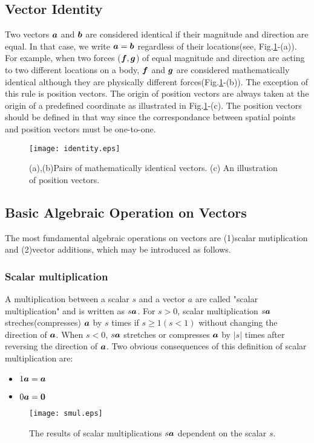 \documentclass[10pt,a4j]{article}
\begin{document}
\subsection{Vector Identity}
Two vectors $\mbox{\boldmath $a$}$ and $\mbox{\boldmath $b$}$ are considered identical 
if their magnitude and direction are equal.
In that case, we write $\mbox{\boldmath $a$}=\mbox{\boldmath $b$}$ regardless of their locations(see, Fig.\ref{fig:fig1_2}-(a)). 
For example, when two forces ($\mbox{\boldmath $f$}, \mbox{\boldmath $g$}$) of equal magnitude and direction 
are acting to two different locations on a body, 
$\mbox{\boldmath $f$}$ and $\mbox{\boldmath $g$}$ are considered mathematically identical although they 
are physically different forces(Fig.\ref{fig:fig1_2}-(b)).
The exception of this rule is position vectors. 
The origin of position vectors are always taken at 
the origin of a predefined coordinate as illustrated in Fig.\ref{fig:fig1_2}-(c).
The position vectors should be defined in that way since the correspondance between 
spatial points and position vectors must be one-to-one. 
\begin{figure}[h]
	\begin{center}
	\texttt{[image: identity.eps]} 
	\end{center}
	\caption{(a),(b)Pairs of mathematically identical vectors. 
	(c) An illustration of position vectors.} 
	\label{fig:fig1_2}
\end{figure}
\subsection{Basic Algebraic Operation on Vectors}
The most fundamental algebraic operations on vectors are (1)scalar mutiplication 
and (2)vector additions, which may be introduced as follows.
\subsubsection{Scalar multiplication}
A multiplication between a scalar $s$ and a vector $a$ are called 
"scalar multiplication" and is written as $s\mbox{\boldmath $a$}$. 
For $s>0$, scalar multiplication $s\mbox{\boldmath $a$}$ streches(compresses) $\mbox{\boldmath $a$}$ by  $s$ times 
if $s \geq 1(s<1)$ without changing the direction of $\mbox{\boldmath $a$}$.
When $s<0$, $s\mbox{\boldmath $a$}$ stretches or compresses $\mbox{\boldmath $a$}$ by $|s|$ times after reversing 
the direction of $\mbox{\boldmath $a$}$. 
Two obvious consequences of this definition of scalar multiplication are:
\begin{itemize}
\item 
	$1\mbox{\boldmath $a$}=\mbox{\boldmath $a$}$
\item 
	$0\mbox{\boldmath $a$}=\mbox{\boldmath $0$}$
\end{itemize}
\begin{figure}[h]
	\begin{center}
	\texttt{[image: smul.eps]} 
	\end{center}
	\caption{The results of scalar multiplications $s\mbox{\boldmath $a$}$ dependent on the scalar $s$.} 
	\label{fig:fig1_3}
\end{figure}
\end{document}
